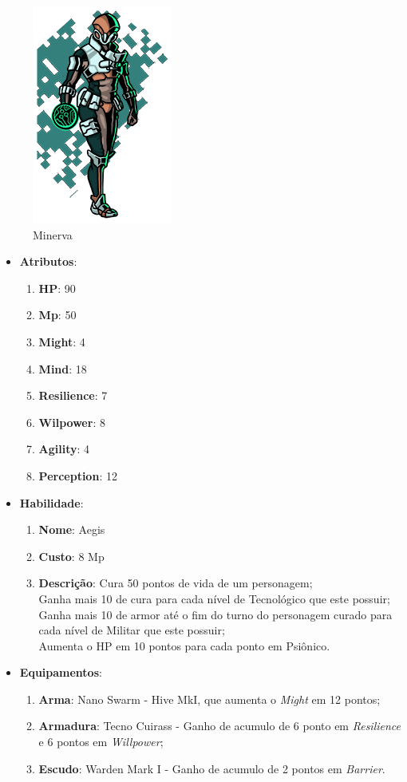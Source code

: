 \documentclass[11pt]{article} %
\begin{document}
\begin{figure}[!htp]
\centering
\includegraphics[scale=0.5]{res/characters/Minerva.png}
\caption{Minerva}
\label{Minerva}
\end{figure}

\begin{itemize}
\item \textbf{Atributos}:
  \begin{enumerate}
    \item \textbf{HP}: 90
    \item \textbf{Mp}: 50
    \item \textbf{Might}: 4
    \item \textbf{Mind}: 18
    \item \textbf{Resilience}: 7
    \item \textbf{Wilpower}: 8
    \item \textbf{Agility}: 4
    \item \textbf{Perception}: 12
  \end{enumerate}
\item \textbf{Habilidade}:
  \begin{enumerate}
    \item \textbf{Nome}: Aegis
    \item \textbf{Custo}: 8 Mp
    \item \textbf{Descrição}: Cura 50 pontos de vida de um personagem;\\
    Ganha mais 10 de cura para cada nível de Tecnológico que este possuir;\\
    Ganha mais 10 de armor até o fim do turno do personagem curado para cada nível de Militar que este possuir;\\
    Aumenta o HP em 10 pontos para cada ponto em Psiônico.
  \end{enumerate}
\item \textbf{Equipamentos}:
  \begin{enumerate}
    \item \textbf{Arma}: Nano Swarm - Hive MkI, que aumenta o \textit{Might} em 12 pontos;
    \item \textbf{Armadura}: Tecno Cuirass - Ganho de acumulo de 6 ponto em \textit{Resilience} e 6 pontos em \textit{Willpower};
    \item \textbf{Escudo}: Warden Mark I - Ganho de acumulo de 2 pontos em \textit{Barrier}.
  \end{enumerate}
\end{itemize}
\end{document}
